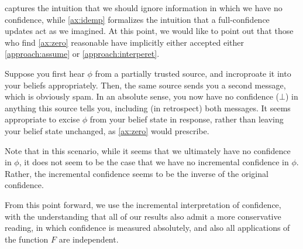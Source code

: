  captures the intuition that we should ignore information in which we have no confidence, while \cref{ax:idemp} formalizes the intuition that a full-confidence updates act as we imagined.
At this point, we would like to point out that those who find \cref{ax:zero} reasonable have implicitly either accepted either \cref{approach:assume} or \cref{approach:interperet}.

\begin{example}
	Suppose you first hear $\phi$ from a partially trusted source, and incroproate it into your beliefs appropriately.
	Then, the same source sends you a second message, which is obviously spam.
	In an absolute sense, you now have no confidence ($\bot$) in anything this source tells you, including (in retrospect) both messages.
	It seems appropriate to excise $\phi$ from your belief state in response, rather than leaving your belief state unchanged, as \cref{ax:zero} would prescribe.

	Note that in this scenario, while it seems that we ultimately have no confidence in $\phi$, it does not seem to be the case that we have no incremental confidence in $\phi$.
	Rather, the incremental confidence seems to be the inverse of the original confidence.
\end{example}

From this point forward, we use the incremental interpretation of confidence, with the understanding that
all of our results also admit a more conservative reading, in which confidence is measured absolutely, and also all applications of the function $F$ are independent. 






